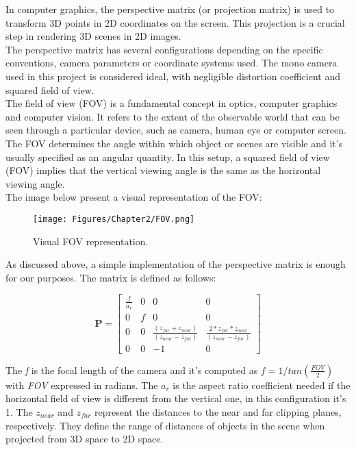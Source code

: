 In computer graphics, the perspective matrix (or projection matrix) is used to transform 3D points in 2D coordinates on the screen. This projection is a crucial step in rendering 3D scenes in 2D images.\parencite{HughesDamEtAl13}\\
\noindent
The perspective matrix has several configurations depending on the specific conventions, camera parameters or coordinate systems used. The mono camera used in this project is considered ideal, with negligible distortion coefficient and squared field of view. \\
The field of view (FOV) is a fundamental concept in optics, computer graphics and computer vision. It refers to the extent of the observable world that can be seen through a particular device, such as camera, human eye or computer screen. The FOV determines the angle within which object or scenes are visible and it's usually specified as an angular quantity. In this setup, a squared field of view (FOV) implies that the vertical viewing angle is the same as the horizontal viewing angle. \\
The image below present a visual representation of the FOV:

\begin{figure}[th]
    \centering
    \texttt{[image: Figures/Chapter2/FOV.png]}
    \caption[FOV]{Visual FOV representation.}
    \label{fig:FOV}
\end{figure}

\noindent
As discussed above, a simple implementation of the perspective matrix is enough for our purposes. The matrix is defined as follows:

\begin{equation}
    \textbf{P} = 
    \begin{bmatrix}
    \frac{f}{a_{r}} & 0 & 0 & 0\\
    0 & f & 0 & 0\\
    0 & 0 & \frac{(z_{far} + z_{near})}{(z_{near} - z_{far})} & \frac{2*z_{far}*z_{near}}{(z_{near} - z_{far})}\\
    0 & 0 & -1 & 0
\end{bmatrix}
\end{equation}

The \textit{f} is the focal length of the camera and it's computed as $f = 1/tan(\frac{FOV}{2})$ with \textit{FOV} expressed in radians. The $a_{r}$ is the aspect ratio coefficient needed if the horizontal field of view is different from the vertical one, in this configuration it's 1. The $z_{near}$ and $z_{far}$ represent the distances to the near and far clipping planes, respectively. They define the range of distances of objects in the scene when projected from 3D space to 2D space.

